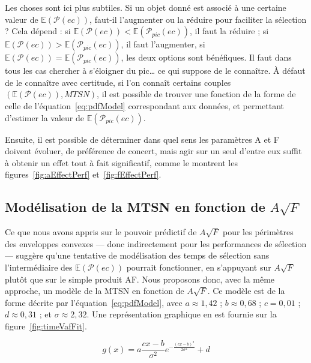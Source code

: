 	Les choses sont ici plus subtiles. Si un objet donné est associé à une certaine valeur de $\mathbb{E}(\mathcal{P}(ec))$, faut-il l'augmenter ou la réduire pour faciliter la sélection ? Cela dépend : si $\mathbb{E}(\mathcal{P}(ec)) < \mathbb{E}(\mathcal{P}_{pic}(ec))$, il faut la réduire ; si $\mathbb{E}(\mathcal{P}(ec)) > \mathbb{E}(\mathcal{P}_{pic}(ec))$, il faut l'augmenter, si $\mathbb{E}(\mathcal{P}(ec)) = \mathbb{E}(\mathcal{P}_{pic}(ec))$, les deux options sont bénéfiques. Il faut dans tous les cas chercher à \og s'éloigner \fg{} du pic\ldots{} ce qui suppose de le connaître. À défaut de le connaître avec certitude, si l'on connaît certains couples $\left( \mathbb{E}(\mathcal{P}(ec)), MTSN\right)$, il est possible de trouver une fonction de la forme de celle de l'équation~\ref{eq:pdfModel} correspondant aux données, et permettant d'estimer la valeur de $\mathbb{E}(\mathcal{P}_{pic}(ec))$.
	
	Ensuite, il est possible de déterminer dans quel sens les paramètres A et F doivent évoluer, de préférence de concert, mais agir sur un seul d'entre eux suffit à obtenir un effet tout à fait significatif, comme le montrent les figures~\ref{fig:aEffectPerf} et~\ref{fig:fEffectPerf}.
	
	\subsection{Modélisation de la MTSN en fonction de \texorpdfstring{$A\sqrt{F}$}{A* racine carrée de F}}
	Ce que nous avons appris sur le pouvoir prédictif de $A\sqrt{F}$ pour les périmètres des enveloppes convexes --- donc indirectement pour les performances de sélection --- suggère qu'une tentative de modélisation des temps de sélection sans l'intermédiaire des $\mathbb{E}(\mathcal{P}(ec))$ pourrait fonctionner, en s'appuyant sur $A\sqrt{F}$ plutôt que sur le simple produit AF. Nous proposons donc, avec la même approche, un modèle de la MTSN en fonction de $A\sqrt{F}$. Ce modèle est de la forme décrite par l'équation~\ref{eq:pdfModel}, avec $a \approx 1,42$ ; $b \approx 0,68$ ; $c = 0,01$ ; $d \approx 0,31$ ; et $\sigma \approx 2,32$. Une représentation graphique en est fournie sur la figure~\ref{fig:timeVafFit}.
	
	\begin{equation}
		g(x) = a\frac{cx-b}{\sigma^{2}}e^{-\frac{(cx-b)^{2}}{2\sigma^{2}} } + d
		\label{eq:pdfModelAf}
	\end{equation}
	
